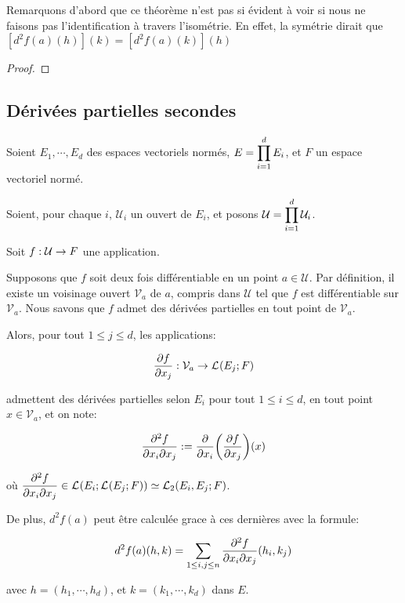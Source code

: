 Remarquons d'abord que ce théorème n'est pas si évident à voir si nous ne
faisons pas l'identification à travers l'isométrie. En effet, la symétrie dirait
que $[d^{2}f(a)(h)](k) = [d^{2}f(a)(k)](h)$

\ifdefined\outputproof
\begin{proof}

\end{proof}
\fi

\subsection{Dérivées partielles secondes}

Soient $E_{1}, \cdots, E_{d}$ des espaces vectoriels normés, $E =
\GSprodSet{i}{1}{d}{E}$, et $F$ un espace vectoriel normé.

Soient, pour chaque $i$, $\mathcal{U}_{i}$ un ouvert de $E_{i}$, et posons
$\mathcal{U} = \GSprodSet{i}{1}{d}{\mathcal{U}}$.

Soit $\GSfunction{f}{\mathcal{U}}{F}$ une application.

\begin{proposition}
	Supposons que $f$ soit deux fois différentiable en un point $a \in
	\mathcal{U}$. Par définition, il existe un voisinage ouvert
	$\mathcal{V}_{a}$ de $a$, compris dans $\mathcal{U}$ tel que $f$ est
	différentiable sur $\mathcal{V}_{a}$.
	Nous savons que $f$ admet des dérivées partielles en tout point de $\mathcal{V}_{a}$.

	Alors, pour tout $1 \leq j \leq d$, les applications:

	\begin{equation}
		\pdv{f}{x_{j}} : \mathcal{V}_{a} \rightarrow \GScontinueHomo{E_{j}}{F}
	\end{equation}

	admettent des dérivées partielles selon $E_{i}$ pour tout $1 \leq i \leq d$,
	en tout point $x \in \mathcal{V}_{a}$, et on note:

	\begin{equation}
		\pdv{f}{x_{i}}{x_{j}} (x) := \pdv{x_{i}}(\pdv{f}{x_{j}}) (x)
	\end{equation}

	où $\displaystyle \pdv{f}{x_{i}}{x_{j}} \in
	\GScontinueHomo{E_{i}}{\GScontinueHomo{E_{j}}{F}} \identification
	\GScontinueHomo[2]{E_{i}, E_{j}}{F}$.

	De plus, $d^{2}f(a)$ peut être calculée grace à ces dernières avec la
	formule:

	\begin{equation}
		d^{2}f(a)(h, k) = \displaystyle \sum_{1 \leq i, j \leq n}
		\pdv{f}{x_{i}}{x_{j}} (a) (h_{i}, k_{j})
	\end{equation}

	avec $h = (h_{1}, \cdots, h_{d})$, et $k = (k_{1}, \cdots, k_{d})$ dans $E$.

\end{proposition}

